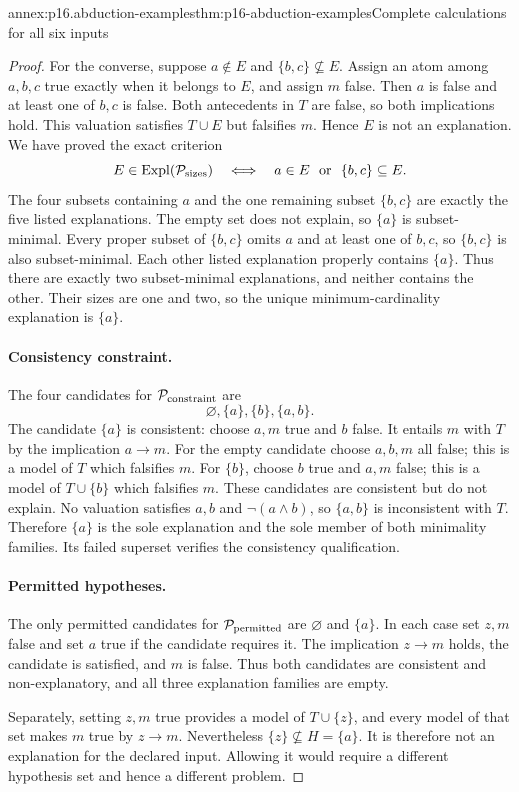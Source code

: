 \begin{annexitem}{annex:p16.abduction-examples}{thm:p16-abduction-examples}{Complete calculations for all six inputs}
\begin{proof}
For the converse, suppose \(a\notin E\) and
\(\{b,c\}\nsubseteq E\). Assign an atom among \(a,b,c\) true
exactly when it belongs to \(E\), and assign \(m\) false. Then
\(a\) is false and at least one of \(b,c\) is false. Both antecedents
in \(T\) are false, so both implications hold. This valuation satisfies
\(T\cup E\) but falsifies \(m\). Hence \(E\) is not an
explanation. We have proved the exact criterion
\[
 E\in\operatorname{Expl}(\mathcal P_{\rm sizes})
   \quad\Longleftrightarrow\quad
       a\in E\ \text{ or }\ \{b,c\}\subseteq E.
\]
The four subsets containing \(a\) and the one remaining subset
\(\{b,c\}\) are exactly the five listed explanations. The empty set
does not explain, so \(\{a\}\) is subset-minimal. Every proper
subset of \(\{b,c\}\) omits \(a\) and at least one of \(b,c\),
so \(\{b,c\}\) is also subset-minimal. Each other listed explanation
properly contains \(\{a\}\). Thus there are exactly two subset-minimal
explanations, and neither contains the other. Their sizes are one and two,
so the unique minimum-cardinality explanation is \(\{a\}\).

\paragraph{Consistency constraint.}
The four candidates for \(\mathcal P_{\rm constraint}\) are
\[
 \varnothing,\{a\},\{b\},\{a,b\}.
\]
The candidate
\(\{a\}\) is consistent: choose \(a,m\) true and \(b\) false.
It entails \(m\) with \(T\) by the implication \(a\to m\).
For the empty candidate choose \(a,b,m\) all false; this is a model
of \(T\) which falsifies \(m\). For \(\{b\}\), choose
\(b\) true and \(a,m\) false; this is a model of \(T\cup\{b\}\)
which falsifies \(m\). These candidates are consistent but do not
explain. No valuation satisfies \(a,b\) and \(\neg(a\land b)\),
so \(\{a,b\}\) is inconsistent with \(T\). Therefore
\(\{a\}\) is the sole explanation and the sole member of both
minimality families. Its failed superset verifies the consistency qualification.

\paragraph{Permitted hypotheses.}
The only permitted candidates for \(\mathcal P_{\rm permitted}\) are
\(\varnothing\) and \(\{a\}\). In each case set \(z,m\) false
and set \(a\) true if the candidate requires it. The implication
\(z\to m\) holds, the candidate is satisfied, and \(m\) is false.
Thus both candidates are consistent and non-explanatory, and all three
explanation families are empty.

Separately, setting \(z,m\) true provides a model of \(T\cup\{z\}\),
and every model of that set makes \(m\) true by \(z\to m\).
Nevertheless \(\{z\}\nsubseteq H=\{a\}\). It is therefore not
an explanation for the declared input. Allowing it would require a different
hypothesis set and hence a different problem.
\end{proof}
\end{annexitem}

